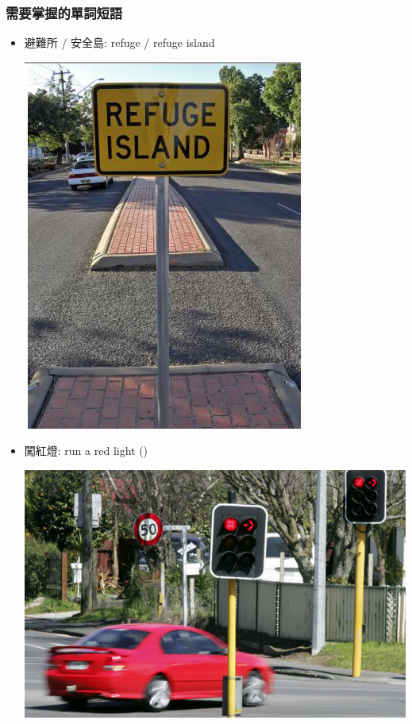 \subsubsection*{需要掌握的單詞短語}
\begin{multicols}{2}
\begin{itemize}
  \itemsep0em
  \item 避難所 / 安全島: refuge / refuge island
  \begin{center}
    \includegraphics[scale=0.4]{pics/refuge-island}
  \end{center}
  \item 闖紅燈: run a red light ()
  \begin{center}
    \includegraphics[scale=0.4]{pics/run-red-light}

\end{center}
\end{itemize}
\end{multicols}
